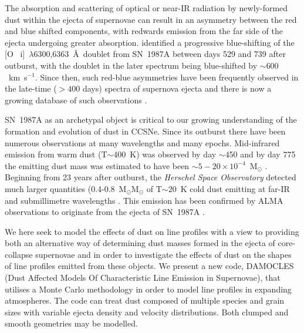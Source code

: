 \documentclass[useAMS,usenatbib,usegraphicx]{mnras}
\begin{document}
The absorption and scattering of optical or near-IR radiation by 
newly-formed dust within the ejecta of supernovae can result in an 
asymmetry between the red and blue shifted components, with redwards 
emission from the far side of the ejecta undergoing greater absorption. 
\citet{Lucy1989} identified a progressive blue-shifting of the [O~{\sc 
i}]~$\lambda$6300,6363~\AA\ doublet from SN~1987A between days 529 and 739 
after outburst, with the doublet in the later spectrum being blue-shifted 
by $\sim 600 $~km~s$^{-1}$. Since then, such red-blue asymmetries have 
been frequently observed in the late-time ($ > 400$ days) spectra of 
supernova ejecta and there is now a growing database of such observations 
\citep{Lucy1989,Fabbri2011,Mauerhan2012,Milisavljevic2012}.

SN~1987A as an archetypal object is critical to our growing understanding 
of the formation and evolution of dust in CCSNe.  Since its outburst there 
have been numerous observations at many wavelengths and many epochs. 
Mid-infrared emission from warm dust (T$\sim$400~K) was observed by day 
$\sim$450 \citep{Roche1989, Bouchet1991, Wooden1993} and by day 775 the 
emitting dust mass was estimated to have been 
$\sim5-20\times10^{-4}$~M$_\odot$ \citep{Wooden1993, Ercolano2007, 
Wesson2015}. Beginning from 23 years after outburst, the {\em Herschel 
Space Observatory} detected much larger quantities 
(0.4-0.8~M$_\odot$M$_\odot$ of T$\sim$20~K cold dust emitting at far-IR 
and submillimetre wavelengths \citep{Matsuura2011, Matsuura2015}. This 
emission has been confirmed by ALMA observations to originate from the 
ejecta of SN~1987A \citep{Indebetouw2014}.


We here seek to model  the effects of dust on line profiles with a 
view to providing both an alternative way of determining dust 
masses formed in the ejecta of core-collapse supernovae and in order to investigate 
the  effects of dust on the shapes of line profiles emitted from 
these objects.  We present a new code, DAMOCLES (Dust Affected Models Of 
Characteristic Line Emission in Supernovae), that utilises a Monte Carlo 
methodology in order to  model line profiles in expanding 
atmospheres.  The code can treat dust composed of multiple species 
and grain sizes with variable ejecta density and velocity distributions.  Both 
clumped and smooth geometries may be modelled.
\end{document}
